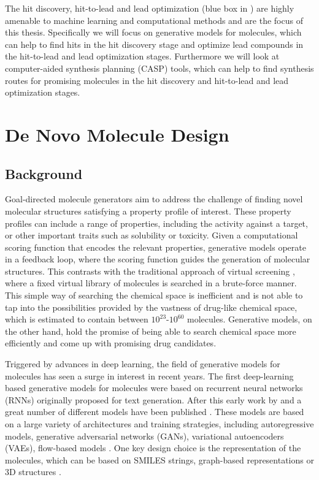 The hit discovery, hit-to-lead and lead optimization (blue box in
) are highly amenable to machine learning and
computational methods and are the focus of this thesis. Specifically 
we will focus on generative models for molecules, which can help to 
find hits in the hit discovery stage and optimize lead compounds in the
hit-to-lead and lead optimization stages. Furthermore we will look at 
computer-aided synthesis planning (CASP) tools, which can help to find
synthesis routes for promising molecules in the hit discovery and hit-to-lead and lead optimization
stages.

\section{De Novo Molecule Design\label{sec:denovo}}
\subsection{Background}
Goal-directed molecule generators aim to address the challenge of finding novel
molecular structures satisfying a property profile of interest. These property
profiles can include a range of properties, including the activity against a
target, or other important traits such as solubility or toxicity. Given a
computational scoring function that encodes the relevant properties, generative
models operate in a feedback loop, where the scoring function guides the
generation of molecular structures. This contrasts with the traditional approach
of virtual screening \citep{todo}, where a fixed virtual library of molecules is
searched in a brute-force manner. This simple way of searching the chemical
space is inefficient and is not able to tap into the possibilities provided by
the vastness of drug-like chemical space, which is estimated to contain between
$10^{23}$-$10^{60}$ molecules. Generative models, on the other hand, hold the
promise of being able to search chemical space more efficiently and come up with
promising drug candidates.

Triggered by advances in deep learning, the field of generative models for
molecules has seen a surge in interest in recent years. The first deep-learning
based generative models for molecules were based on recurrent neural networks
(RNNs) originally proposed for text generation. After this early work by
\citep{seglerGeneratingFocusedMolecule2018} and
\citep{gomez-bombarelliAutomaticChemicalDesign2018} a great number of different
models have been published
\citep{eltonDeepLearningMolecular2019,sanchez-lengelingInverseMolecularDesign2018}.
These models are based on a large variety of architectures and training
strategies, including autoregressive models, generative adversarial networks
(GANs), variational autoencoders (VAEs), flow-based models
\citep{madhawaGraphNVPInvertibleFlow2019}. One key design choice is the
representation of the molecules, which can be based on SMILES strings,
graph-based representations or 3D structures
\citep{eltonDeepLearningMolecular2019,sanchez-lengelingInverseMolecularDesign2018,pangDeepGenerativeModels2024}.

